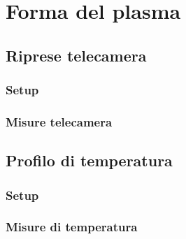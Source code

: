 \chapter{Forma del plasma}
\label{ch:forma}

\section{Riprese telecamera}

\subsection{Setup}

\subsection{Misure telecamera}

\section{Profilo di temperatura}

\subsection{Setup}

\subsection{Misure di temperatura}

